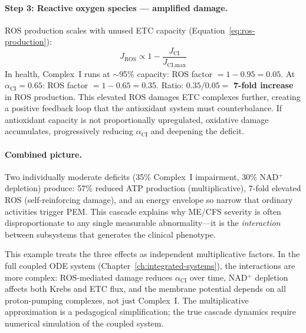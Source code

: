 \paragraph{Step 3: Reactive oxygen species --- amplified damage.}
ROS production scales with unused ETC capacity (Equation~\ref{eq:ros-production}):
\[
J_{\text{ROS}} \propto 1 - \frac{J_{\text{CI}}}{J_{\text{CI,max}}}
\]
In health, Complex~I runs at $\sim$95\% capacity: ROS factor $= 1 - 0.95 = 0.05$. At $\alpha_{\text{CI}} = 0.65$: ROS factor $= 1 - 0.65 = 0.35$. Ratio: $0.35/0.05 = $ \textbf{7-fold increase} in ROS production. This elevated ROS damages ETC complexes further, creating a positive feedback loop that the antioxidant system must counterbalance. If antioxidant capacity is not proportionally upregulated, oxidative damage accumulates, progressively reducing $\alpha_{\text{CI}}$ and deepening the deficit.

\paragraph{Combined picture.} Two individually moderate deficits (35\% Complex~I impairment, 30\% NAD$^+$ depletion) produce: 57\% reduced ATP production (multiplicative), 7-fold elevated ROS (self-reinforcing damage), and an energy envelope so narrow that ordinary activities trigger PEM. This cascade explains why ME/CFS severity is often disproportionate to any single measurable abnormality---it is the \emph{interaction} between subsystems that generates the clinical phenotype.

\begin{limitation}
This example treats the three effects as independent multiplicative factors. In the full coupled ODE system (Chapter~\ref{ch:integrated-systems}), the interactions are more complex: ROS-mediated damage reduces $\alpha_{\text{CI}}$ over time, NAD$^+$ depletion affects both Krebs and ETC flux, and the membrane potential depends on all proton-pumping complexes, not just Complex~I. The multiplicative approximation is a pedagogical simplification; the true cascade dynamics require numerical simulation of the coupled system.
\end{limitation}
